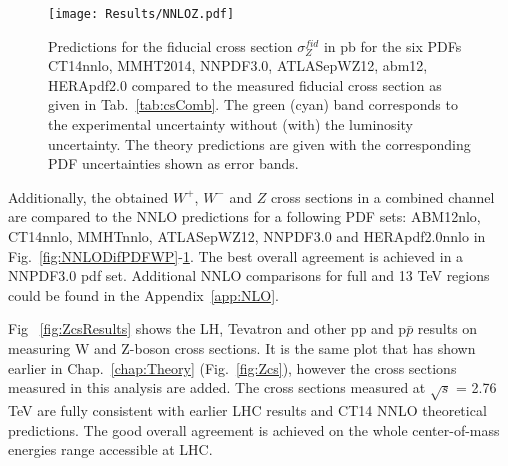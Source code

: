 \begin{figure}[!tbp]
\begin{center}
\texttt{[image: Results/NNLOZ.pdf]}
\end{center}
\caption{Predictions for the fiducial cross section $\sigma^{fid}_Z$ in pb for the six PDFs CT14nnlo, MMHT2014, NNPDF3.0, ATLASepWZ12, abm12, HERApdf2.0 compared to the measured fiducial cross section as given in Tab.~\ref{tab:csComb}. The green (cyan) band corresponds to the experimental uncertainty without (with) the luminosity uncertainty. The theory predictions are given with the corresponding PDF uncertainties shown as error bands.}
\label{fig:NNLODifPDFZ}
\end{figure}

Additionally, the obtained $W^+$, $W^-$ and $Z$ cross sections in a combined channel are compared to the NNLO predictions for a following PDF sets: ABM12nlo\cite{ABM12}, CT14nnlo\cite{CT14}, MMHTnnlo\cite{MMHT}, ATLASepWZ12\cite{ATLASEP}, NNPDF3.0\cite{NNPDF23} and HERApdf2.0nnlo\cite{HERAPDF} in Fig.~\ref{fig:NNLODifPDFWP}-\ref{fig:NNLODifPDFZ}. The best overall agreement is achieved in a NNPDF3.0 pdf set.  Additional NNLO comparisons for full and 13 TeV regions could be found in the Appendix~\ref{app:NLO}.  

Fig ~\ref{fig:ZcsResults} shows the LH, Tevatron and other pp and p$\bar{p}$ results on measuring W and Z-boson cross sections. It is the same plot that has shown earlier in Chap.~\ref{chap:Theory} (Fig.~\ref{fig:Zcs}), however the cross sections measured in this analysis are added. The cross sections measured at $\sqrt{s}$ = 2.76 TeV are fully consistent with earlier LHC results and CT14 NNLO theoretical predictions. The good overall agreement is achieved on the whole center-of-mass energies range accessible at LHC.


